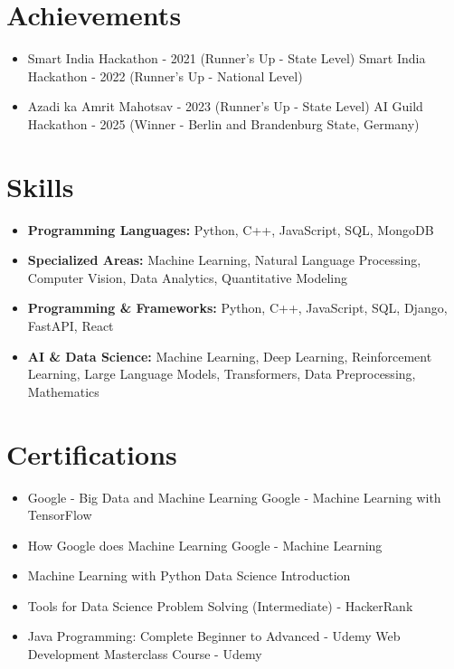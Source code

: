 \documentclass[a4paper,10pt]{article}
\begin{document}
\section*{Achievements}
\begin{itemize}
\item Smart India Hackathon - 2021 (Runner's Up - State Level) \hfill Smart India Hackathon - 2022 (Runner's Up - National Level)
\item Azadi ka Amrit Mahotsav - 2023 (Runner's Up - State Level) \hfill AI Guild Hackathon - 2025 (Winner - Berlin and Brandenburg State, Germany)
\end{itemize}

\section*{Skills}
\begin{itemize}
  \item \textbf{Programming Languages:} Python, C++, JavaScript, SQL, MongoDB
  \item \textbf{Specialized Areas:} Machine Learning, Natural Language Processing, Computer Vision, Data Analytics, Quantitative Modeling
  \item \textbf{Programming \& Frameworks:} Python, C++, JavaScript, SQL, Django, FastAPI, React
  \item \textbf{AI \& Data Science:} Machine Learning, Deep Learning, Reinforcement Learning, Large Language Models, Transformers, Data Preprocessing, Mathematics
\end{itemize}

\section*{Certifications}
\begin{itemize}
\item Google - Big Data and Machine Learning \hfill Google - Machine Learning with TensorFlow
\item How Google does Machine Learning \hfill Google - Machine Learning
\item Machine Learning with Python \hfill Data Science Introduction
\item Tools for Data Science \hfill Problem Solving (Intermediate) - HackerRank
\item Java Programming: Complete Beginner to Advanced - Udemy \hfill Web Development Masterclass Course - Udemy
\end{itemize}
\end{document}
